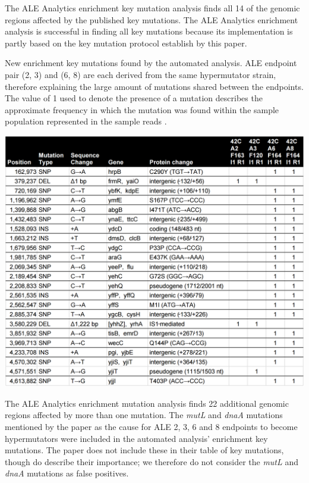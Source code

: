 \documentclass[12pt,final,masters,chapterheads]{ucsd}  %
\begin{document}
The ALE Analytics enrichment key mutation analysis finds all 14 of the genomic regions affected by the published key mutations. The ALE Analytics enrichment analysis is successful in finding all key mutations because its implementation is partly based on the key mutation protocol establish by this paper.
\begin{table}[H]
  \centering
  \caption[New enrichment key mutations found by the automated analysis]{New enrichment key mutations found by the automated analysis. ALE endpoint pair (2, 3) and (6, 8) are each derived from the same hypermutator strain, therefore explaining the large amount of mutations shared between the endpoints. The value of 1 used to denote the presence of a mutation describes the approximate frequency in which the mutation was found within the sample population represented in the sample reads \cite{breseq_paper}.}
  \includegraphics[width=\textwidth]{42c_new_enrich_muts.png}
\end{table}
The ALE Analytics enrichment mutation analysis finds 22 additional genomic regions affected by more than one mutation. The \textit{mutL} and \textit{dnaA} mutations mentioned by the paper as the cause for ALE 2, 3, 6 and 8 endpoints to become hypermutators were included in the automated analysis' enrichment key mutations. The paper does not include these in their table of key mutations, though do describe their importance; we therefore do not consider the \textit{mutL} and \textit{dnaA} mutations as false positives.
\end{document}
